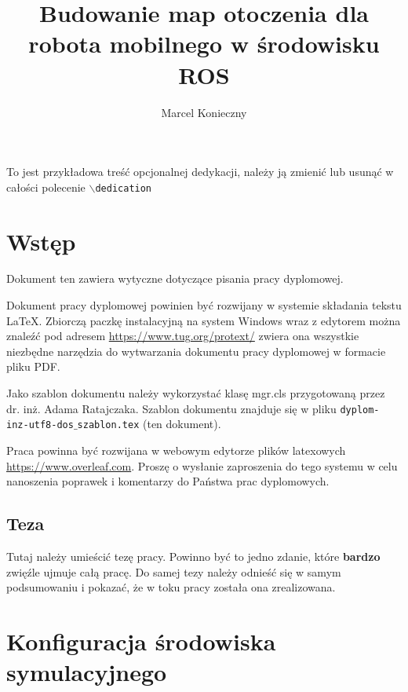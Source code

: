 \documentclass[eng,printmode]{mgr}
\title{Budowanie map otoczenia dla robota mobilnego w środowisku ROS}
\author{Marcel Konieczny}
\begin{document}

    \maketitle %
    \dedication{6cm}{To jest przykładowa treść opcjonalnej dedykacji, należy ją zmienić lub usunąć w całości polecenie \texttt{$\backslash$dedication}}

    \tableofcontents %

    \chapter{Wstęp}

    Dokument ten zawiera wytyczne dotyczące pisania pracy dyplomowej.

    Dokument pracy dyplomowej powinien być rozwijany w systemie składania
    tekstu LaTeX.
    Zbiorczą paczkę instalacyjną na system Windows wraz z edytorem można
    znaleźć pod adresem
    \url{https://www.tug.org/protext/}
    zwiera ona wszystkie niezbędne narzędzia do wytwarzania dokumentu pracy
    dyplomowej
    w formacie pliku PDF.

    Jako szablon dokumentu należy wykorzystać klasę mgr.cls przygotowaną przez
    dr. inż. Adama Ratajczaka. Szablon dokumentu znajduje się w pliku
    \texttt{dyplom-inz-utf8-dos$\_$szablon.tex} (ten dokument).

    Praca powinna być rozwijana w webowym edytorze plików latexowych
    \url{https://www.overleaf.com}.
    Proszę o wysłanie zaproszenia do tego systemu w celu nanoszenia
    poprawek i komentarzy do Państwa prac dyplomowych.

    \section{Teza}
    \label{sec:Teza}

    Tutaj należy umieścić tezę pracy. Powinno być to jedno zdanie, które
    \textbf{bardzo} zwięźle ujmuje całą pracę. Do samej tezy należy
    odnieść się w samym podsumowaniu i pokazać, że w toku pracy została
    ona zrealizowana.


    \chapter{Konfiguracja środowiska symulacyjnego}
\end{document}
